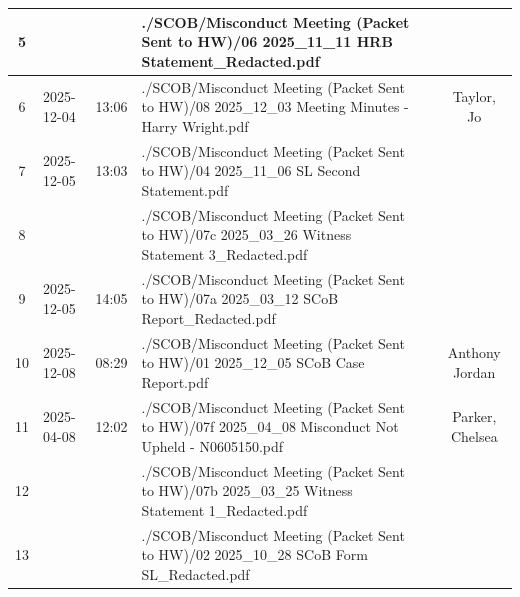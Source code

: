 \begin{landscape}
\begin{tabularx}{\linewidth}{|c|l|l|X|c|c|}
		5                                &                     &                & ./SCOB/Misconduct Meeting (Packet Sent to HW)/06 2025\_11\_11 HRB Statement\_Redacted.pdf                              &                         &                          \\ \hline
		6                                & 2025-12-04          & 13:06          & ./SCOB/Misconduct Meeting (Packet Sent to HW)/08 2025\_12\_03 Meeting Minutes - Harry Wright.pdf                       &                         & Taylor, Jo               \\ \hline
		7                                & 2025-12-05          & 13:03          & ./SCOB/Misconduct Meeting (Packet Sent to HW)/04 2025\_11\_06 SL Second Statement.pdf                                  &                         &                          \\ \hline
		8                                &                     &                & ./SCOB/Misconduct Meeting (Packet Sent to HW)/07c 2025\_03\_26 Witness Statement 3\_Redacted.pdf                       &                         &                          \\ \hline
		9                                & 2025-12-05          & 14:05          & ./SCOB/Misconduct Meeting (Packet Sent to HW)/07a 2025\_03\_12 SCoB Report\_Redacted.pdf                               &                         &                          \\ \hline
		10                               & 2025-12-08          & 08:29          & ./SCOB/Misconduct Meeting (Packet Sent to HW)/01 2025\_12\_05 SCoB Case Report.pdf                                     &                         & Anthony Jordan           \\ \hline
		11                               & 2025-04-08          & 12:02          & ./SCOB/Misconduct Meeting (Packet Sent to HW)/07f 2025\_04\_08 Misconduct Not Upheld - N0605150.pdf                    &                         & Parker, Chelsea          \\ \hline
		12                               &                     &                & ./SCOB/Misconduct Meeting (Packet Sent to HW)/07b 2025\_03\_25 Witness Statement 1\_Redacted.pdf                       &                         &                          \\ \hline
		13                               &                     &                & ./SCOB/Misconduct Meeting (Packet Sent to HW)/02 2025\_10\_28 SCoB Form SL\_Redacted.pdf                               &                         &                          \\ \hline

\end{tabularx}
\end{landscape}
